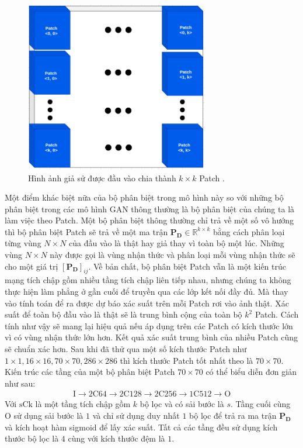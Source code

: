 \documentclass[a4paper, 12pt]{article}
\begin{document}
\begin{figure}[!h]
\captionsetup{width=0.8\textwidth}
\centering
\includegraphics[width=8cm]{images/patch.png}
\caption{Hình ảnh giả sử được đầu vào chia thành $k\times k$ Patch \cite{khanhpix2pix2020}.}
\end{figure}

\noindent
Một điểm khác biệt nữa của bộ phân biệt trong mô hình này so với những bộ phân biệt trong các mô hình GAN thông thường là bộ phân biệt của chúng ta là làm việc theo Patch. Một bộ phân biệt thông thường chỉ trả về một số vô hướng thì bộ phân biệt Patch sẽ trả về một ma trận $\mathbf{P_D} \in \mathbb{R}^{k\times k}$ bằng cách phân loại từng vùng $N \times N$ của đầu vào là thật hay giả thay vì toàn bộ một lúc. Những vùng $N \times N$ này được gọi là vùng nhận thức và phân loại mỗi vùng nhận thức sẽ cho một giá trị $\left[\mathbf{P_D}\right]_{ij}$. Về bản chất, bộ phân biệt Patch vẫn là một kiến trúc mạng tích chập gồm nhiều tầng tích chập liên tiếp nhau, nhưng chúng ta không thực hiện làm phẳng ở gần cuối để truyền qua các lớp kết nối đầy đủ. Mà thay vào tính toán để ra được dự báo xác suất trên mỗi Patch rơi vào ảnh thật. Xác suất để toàn bộ đầu vào là thật sẽ là trung bình cộng của toàn bộ $k^2$ Patch. Cách tính như vậy sẽ mang lại hiệu quả nếu áp dụng trên các Patch có kích thước lớn vì có vùng nhận thức lớn hơn. Kết quả xác suất trung bình của nhiều Patch cũng sẽ chuẩn xác hơn. Sau khi đã thử qua một số kích thước Patch như $1\times 1, 16\times 16, 70\times 70, 286\times 286$ thì kích thước Patch tốt nhất theo \cite{isola2018imagetoimage} là $70 \times 70$.\vspace{5pt}\\
Kiến trúc các tầng của một bộ phân biệt Patch $70\times 70$ có thể biểu diễn đơn giản như sau:
\begin{align*}
    \text{I} \rightarrow \text{2C64} \rightarrow \text{2C128} \rightarrow \text{2C256} \rightarrow \text{1C512} \rightarrow \text{O}
\end{align*}
Với $\text{sCk}$ là một tầng tích chập gồm $k$ bộ lọc và có sải bước là $s$. Tầng cuối cùng $\text{O}$ sử dụng sải bước là $1$ và chỉ sử dụng duy nhất $1$ bộ lọc để trả ra ma trận $\mathbf{P_D}$ và kích hoạt hàm sigmoid để lấy xác suất. Tất cả các tầng đều sử dụng kích thước bộ lọc là $4$ cùng với kích thước đệm là $1$.
\end{document}

